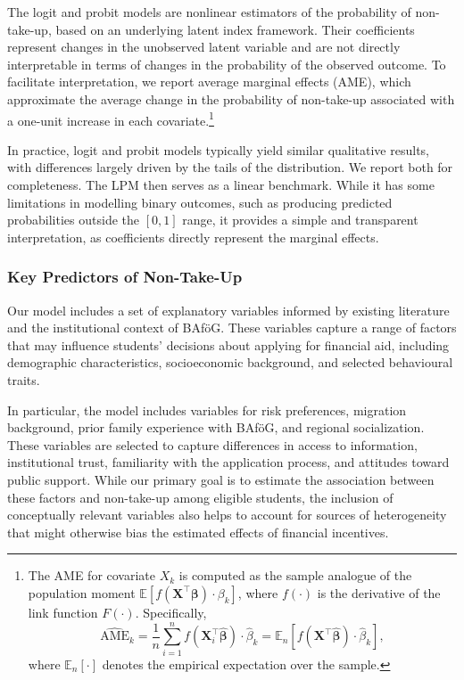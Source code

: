 The logit and probit models are nonlinear estimators of the probability of non-take-up, based on an underlying latent index framework. 
Their coefficients represent changes in the unobserved latent variable and are not directly interpretable in terms of changes in the probability of the observed outcome. 
To facilitate interpretation, we report average marginal effects (AME), which approximate the average change in the probability of non-take-up associated with a one-unit increase in each covariate.\footnote{The AME for covariate \( X_k \) is computed as the sample analogue of the population moment \( \mathbb{E}[f(\mathbf{X}^\top \boldsymbol{\beta}) \cdot \beta_k] \), where \( f(\cdot) \) is the derivative of the link function \( F(\cdot) \). Specifically,
\[
    \widehat{\text{AME}}_k 
    = \frac{1}{n} \sum_{i=1}^n f(\mathbf{X}_i^\top \hat{\boldsymbol{\beta}}) \cdot \hat{\beta}_k
    = \mathbb{E}_n \left[ f(\mathbf{X}^\top \hat{\boldsymbol{\beta}}) \cdot \hat{\beta}_k \right],
\]
where \( \mathbb{E}_n[\cdot] \) denotes the empirical expectation over the sample.}

In practice, logit and probit models typically yield similar qualitative results, with differences largely driven by the tails of the distribution. We report both for completeness. The LPM then serves as a linear benchmark. While it has some limitations in modelling binary outcomes, such as producing predicted probabilities outside the \([0,1]\) range, it provides a simple and transparent interpretation, as coefficients directly represent the marginal effects.

\subsubsection{Key Predictors of Non-Take-Up}
Our model includes a set of explanatory variables informed by existing literature and the institutional context of BAföG. 
These variables capture a range of factors that may influence students' decisions about applying for financial aid, including demographic characteristics, socioeconomic background, and selected behavioural traits. 

In particular, the model includes variables for risk preferences, migration background, prior family experience with BAföG, and regional socialization. These variables are selected to capture differences in access to information, institutional trust, familiarity with the application process, and attitudes toward public support. While our primary goal is to estimate the association between these factors and non-take-up among eligible students, the inclusion of conceptually relevant variables also helps to account for sources of heterogeneity that might otherwise bias the estimated effects of financial incentives.

